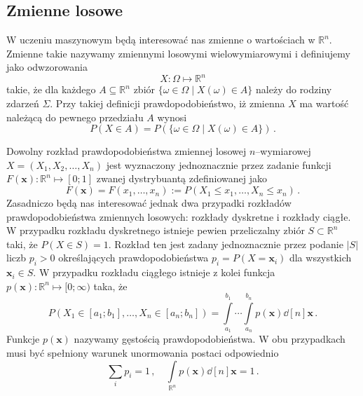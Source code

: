 \documentclass{myclass}
\begin{document}
\subsection{Zmienne losowe}

W uczeniu maszynowym będą interesować nas zmienne o wartościach w \(\mathbb{R}^n\). Zmienne takie
nazywamy zmiennymi losowymi wielowymiarowymi i definiujemy jako odwzorowania
\begin{equation*}
    X: \Omega \mapsto \mathbb{R}^n
\end{equation*}
takie, że dla każdego \(A \subseteq \mathbb{R}^n\) zbiór \(\{\omega \in \Omega \mid X(\omega) \in
A\}\) należy do rodziny zdarzeń \(\Sigma\). Przy takiej definicji prawdopodobieństwo, iż zmienna
\(X\) ma wartość należącą do pewnego przedziału \(A\) wynosi
\begin{equation*}
    P(X \in A) = P(\{\omega \in \Omega \mid X(\omega) \in A\})\,.
\end{equation*}

Dowolny rozkład prawdopodobieństwa zmiennej losowej \(n\)--wymiarowej \(X = (X_1, X_2, \ldots,
X_n)\) jest wyznaczony jednoznacznie przez zadanie funkcji \(F(\mathbf{x}): \mathbb{R}^n \mapsto
[0;1]\) zwanej dystrybuantą zdefiniowanej jako
\begin{equation*}
    F(\mathbf{x}) = F(x_1, \ldots, x_n) := P(X_1 \leq x_1, \ldots, X_n \leq x_n)\,.
\end{equation*}
Zasadniczo będą nas interesować jednak dwa przypadki rozkładów prawdopodobieństwa zmiennych
losowych: rozkłady dyskretne i rozkłady ciągłe. W przypadku rozkładu dyskretnego istnieje pewien
przeliczalny zbiór \(S \subset \mathbb{R}^n\) taki, że \(P(X \in S) = 1\). Rozkład ten jest zadany
jednoznacznie przez podanie \(|S|\) liczb \(p_i > 0\) określających prawdopodobieństwa \(p_i = P(X =
\mathbf{x}_i)\) dla wszystkich \(\mathbf{x}_i \in S\). W przypadku rozkładu ciągłego istnieje z
kolei funkcja \(p(\mathbf{x}): \mathbb{R}^n \mapsto [0; \infty)\) taka, że
\begin{equation*}
    P(X_1 \in [a_1; b_1], \ldots, X_n \in [a_n; b_n]) = \int\limits_{a_1}^{b_1}\cdots\int\limits_{a_n}^{b_n}p(\mathbf{x})\dd[n]{\mathbf{x}}\,.
\end{equation*}
Funkcje \(p(\mathbf{x})\) nazywamy gęstością prawdopodobieństwa. W obu przypadkach musi być
spełniony warunek unormowania postaci odpowiednio
\begin{equation*}
    \sum_i p_i = 1\,,\quad \int\limits_{\mathbb{R}^n}p(\mathbf{x})\dd[n]{\mathbf{x}} = 1\,.
\end{equation*}
\end{document}
